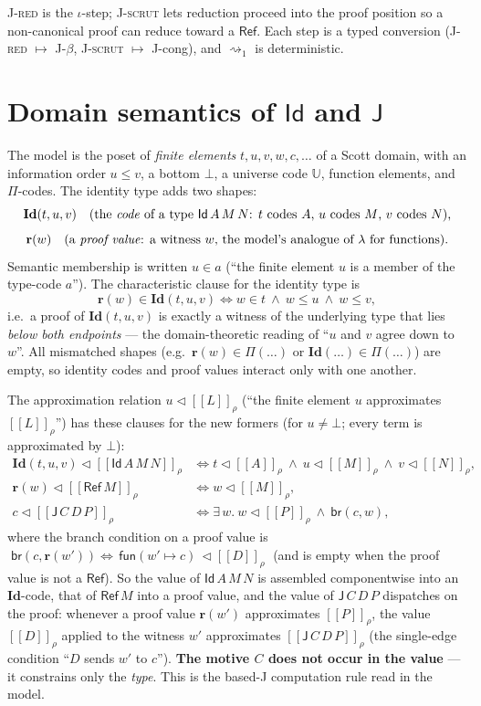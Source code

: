 \documentclass[11pt]{article}
\newcommand{\Id}{\mathsf{Id}}
\newcommand{\Rf}{\mathsf{Ref}}
\newcommand{\Jelim}{\mathsf{J}}
\newcommand{\redone}{\rightsquigarrow_1}
\newcommand{\bU}{\mathbb{U}}
\newcommand{\cId}{\mathbf{Id}}
\newcommand{\rEl}{\mathbf{r}}
\newcommand{\sem}[1]{[\![#1]\!]}
\newcommand{\ev}[2]{#1 \lhd \sem{#2}_{\rho}}   %
\newcommand{\mem}[2]{#1 \in #2}                 %
\begin{document}
\noindent
\textsc{J-red} is the $\iota$-step; \textsc{J-scrut} lets reduction proceed into
the proof position so a non-canonical proof can reduce toward a $\Rf$. Each step
is a typed conversion (\textsc{J-red} $\mapsto$ J-$\beta$, \textsc{J-scrut}
$\mapsto$ J-cong), and $\redone$ is deterministic.

\section*{Domain semantics of $\Id$ and $\Jelim$}

The model is the poset of \emph{finite elements} $t,u,v,w,c,\dots$ of a Scott
domain, with an information order $u\le v$, a bottom $\bot$, a universe code
$\bU$, function elements, and $\Pi$-codes. The identity type adds two shapes:
\[
  \cId(t,u,v) \quad\text{(the \emph{code} of a type $\Id\,A\,M\,N$: $t$ codes
  $A$, $u$ codes $M$, $v$ codes $N$),}
\]
\[
  \rEl(w) \quad\text{(a \emph{proof value}: a witness $w$, the model's analogue
  of $\lambda$ for functions).}
\]
Semantic membership is written $\mem{u}{a}$ (``the finite element $u$ is a
member of the type-code $a$''). The characteristic clause for the identity type
is
\[
  \mem{\rEl(w)}{\cId(t,u,v)}
  \iff
  \mem{w}{t}\ \wedge\ w\le u\ \wedge\ w\le v ,
\]
i.e.\ a proof of $\cId(t,u,v)$ is exactly a witness of the underlying type that
lies \emph{below both endpoints} — the domain-theoretic reading of ``$u$ and
$v$ agree down to $w$''. All mismatched shapes (e.g.\ $\mem{\rEl(w)}{\Pi(\dots)}$
or $\mem{\cId(\dots)}{\Pi(\dots)}$) are empty, so identity codes and proof
values interact only with one another.

\medskip
\noindent
The approximation relation $\ev{u}{L}$ (``the finite element $u$ approximates
$\sem{L}_\rho$'') has these clauses for the new formers (for $u\neq\bot$; every
term is approximated by $\bot$):
\begin{align*}
  \ev{\cId(t,u,v)}{\Id\,A\,M\,N}
    &\iff \ev{t}{A}\ \wedge\ \ev{u}{M}\ \wedge\ \ev{v}{N}, \\[2pt]
  \ev{\rEl(w)}{\Rf\,M}
    &\iff \ev{w}{M}, \\[2pt]
  \ev{c}{\Jelim\,C\,D\,P}
    &\iff \exists\,w.\ \ev{w}{P}\ \wedge\ \mathsf{br}(c,w),
\end{align*}
where the branch condition on a proof value is
$\;\mathsf{br}(c,\rEl(w')) \iff \ev{\,\mathsf{fun}(w'\mapsto c)\,}{D}\;$ (and is
empty when the proof value is not a $\Rf$).
So the value of $\Id\,A\,M\,N$ is assembled componentwise into an $\cId$-code,
that of $\Rf\,M$ into a proof value, and the value of $\Jelim\,C\,D\,P$
dispatches on the proof: whenever a proof value $\rEl(w')$ approximates
$\sem{P}_\rho$, the value $\sem{D}_\rho$ applied to the witness $w'$ approximates
$\sem{\Jelim\,C\,D\,P}_\rho$ (the single-edge condition ``$D$ sends $w'$ to
$c$''). \textbf{The motive $C$ does not occur in the value} — it constrains only
the \emph{type}. This is the based-J computation rule read in the model.
\end{document}
